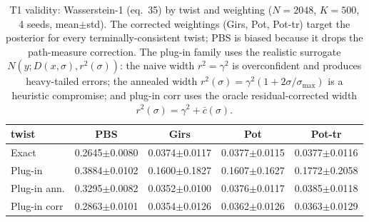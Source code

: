 \begin{table}[ht]
\centering
\caption{T1 validity: Wasserstein-1 (eq.~35) by twist and weighting ($N=2048$, $K=500$, 4 seeds, mean$\pm$std).  The corrected weightings (Girs, Pot, Pot-tr) target the posterior for every terminally-consistent twist; PBS is biased because it drops the path-measure correction.  The plug-in family uses the realistic surrogate $N(y; D(x,\sigma), r^2(\sigma))$: the naive width $r^2=\gamma^2$ is overconfident and produces heavy-tailed errors; the annealed width $r^2(\sigma)=\gamma^2(1+2\sigma/\sigma_{\max})$ is a heuristic compromise; and plug-in corr uses the oracle residual-corrected width $r^2(\sigma)=\gamma^2+\bar c(\sigma)$.}
\label{tab:toy_t1}
\begin{tabular}{lcccc}
\toprule
twist & PBS & Girs & Pot & Pot-tr \\
\midrule
Exact & 0.2645$\pm$0.0080 & 0.0374$\pm$0.0117 & 0.0377$\pm$0.0115 & 0.0377$\pm$0.0116 \\
Plug-in & 0.3884$\pm$0.0102 & 0.1600$\pm$0.1827 & 0.1607$\pm$0.1627 & 0.1772$\pm$0.2058 \\
Plug-in ann. & 0.3295$\pm$0.0082 & 0.0352$\pm$0.0100 & 0.0376$\pm$0.0117 & 0.0385$\pm$0.0118 \\
Plug-in corr & 0.2863$\pm$0.0101 & 0.0354$\pm$0.0126 & 0.0362$\pm$0.0126 & 0.0363$\pm$0.0129 \\
\bottomrule
\end{tabular}
\end{table}
